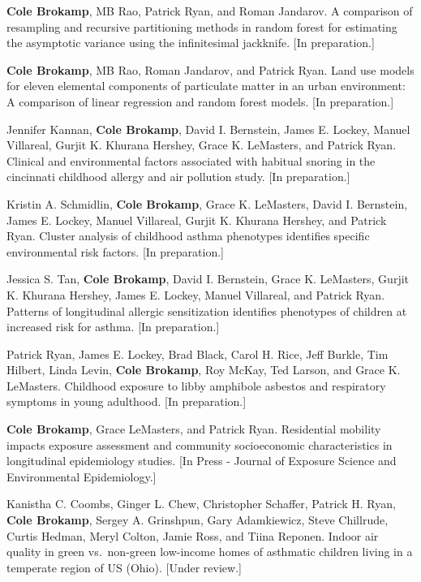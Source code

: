 \documentclass[]{article}
\date{}
\begin{document}
\textbf{Cole Brokamp}, MB Rao, Patrick Ryan, and Roman Jandarov. A
comparison of resampling and recursive partitioning methods in random
forest for estimating the asymptotic variance using the infinitesimal
jackknife. {[}In preparation.{]}

\textbf{Cole Brokamp}, MB Rao, Roman Jandarov, and Patrick Ryan. Land
use models for eleven elemental components of particulate matter in an
urban environment: A comparison of linear regression and random forest
models. {[}In preparation.{]}

Jennifer Kannan, \textbf{Cole Brokamp}, David I. Bernstein, James E.
Lockey, Manuel Villareal, Gurjit K. Khurana Hershey, Grace K. LeMasters,
and Patrick Ryan. Clinical and environmental factors associated with
habitual snoring in the cincinnati childhood allergy and air pollution
study. {[}In preparation.{]}

Kristin A. Schmidlin, \textbf{Cole Brokamp}, Grace K. LeMasters, David
I. Bernstein, James E. Lockey, Manuel Villareal, Gurjit K. Khurana
Hershey, and Patrick Ryan. Cluster analysis of childhood asthma
phenotypes identifies specific environmental risk factors. {[}In
preparation.{]}

Jessica S. Tan, \textbf{Cole Brokamp}, David I. Bernstein, Grace K.
LeMasters, Gurjit K. Khurana Hershey, James E. Lockey, Manuel Villareal,
and Patrick Ryan. Patterns of longitudinal allergic sensitization
identifies phenotypes of children at increased risk for asthma. {[}In
preparation.{]}

Patrick Ryan, James E. Lockey, Brad Black, Carol H. Rice, Jeff Burkle,
Tim Hilbert, Linda Levin, \textbf{Cole Brokamp}, Roy McKay, Ted Larson,
and Grace K. LeMasters. Childhood exposure to libby amphibole asbestos
and respiratory symptoms in young adulthood. {[}In preparation.{]}

\textbf{Cole Brokamp}, Grace LeMasters, and Patrick Ryan. Residential
mobility impacts exposure assessment and community socioeconomic
characteristics in longitudinal epidemiology studies. {[}In Press -
Journal of Exposure Science and Environmental Epidemiology.{]}

Kanistha C. Coombs, Ginger L. Chew, Christopher Schaffer, Patrick H.
Ryan, \textbf{Cole Brokamp}, Sergey A. Grinshpun, Gary Adamkiewicz,
Steve Chillrude, Curtis Hedman, Meryl Colton, Jamie Ross, and Tiina
Reponen. Indoor air quality in green vs.~non-green low-income homes of
asthmatic children living in a temperate region of US (Ohio). {[}Under
review.{]}
\end{document}
